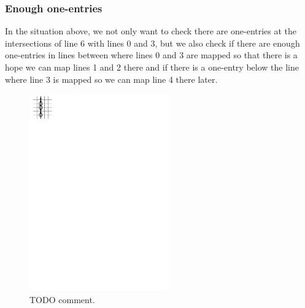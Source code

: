 \subsubsection{Enough one-entries}
In the situation above, we not only want to check there are one-entries at the intersections of line 6 with lines 0 and 3, but we also check if there are enough one-entries in lines between where lines 0 and 3 are mapped so that there is a hope we can map lines 1 and 2 there and if there is a one-entry below the line where line 3 is mapped so we can map line 4 there later.
\begin{figure}[h!]
\centering
\includegraphics[width=60mm]{../img/enough_one-entries.pdf}
\caption{TODO comment.}
\label{enough}
\end{figure}

